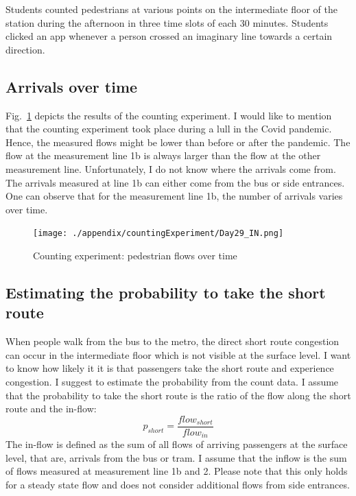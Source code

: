 Students counted pedestrians at various points on the intermediate floor of the station during the afternoon in three time slots of each 30 minutes.
Students clicked an app whenever a person crossed an imaginary line towards a certain direction.


\subsection*{Arrivals over time}


Fig.~\ref{fig:timeslots} depicts the results of the counting experiment. I would like to mention that the counting experiment took place  during a lull in the Covid pandemic. Hence, the measured flows might be lower than before or after the pandemic. The flow at the measurement line 1b is always larger than the flow at the other measurement line. Unfortunately, I do not know where the arrivals come from. The arrivals  measured at line 1b can either come from the bus or side entrances. One can observe that for the measurement line 1b, the number of arrivals varies over time. 


\begin{figure}[hbt!]
\centering
\texttt{[image: ./appendix/countingExperiment/Day29\_IN.png]} 
\caption[Counting experiment: pedestrian flows over time]{Counting experiment: pedestrian flows over time}
\label{fig:timeslots}
\end{figure}




\subsection*{Estimating the probability to take the short route}
When people walk from the bus to the metro, the direct short route congestion can occur in the intermediate floor which is not visible at the surface level. I want to know how likely it it is that passengers take the short route and experience congestion. I suggest to estimate the probability from the count data. I assume that the probability to take the short route is the ratio of the flow along the short route and the in-flow:
\begin{equation}
p_{short} = \frac{flow_{short}}{flow_{in}}
\end{equation}
The in-flow is defined as the sum of all flows of arriving passengers at the surface level, that are, arrivals from the bus or tram. I assume that the inflow is  the sum of flows measured at measurement line 1b and 2. Please note that this only holds for a steady state flow and does not consider additional flows from side entrances.

